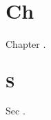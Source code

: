 \chapter{Ch}
Chapter \cite{alpha}.
\bibliographyunit[\section]
\section{S}
Sec \cite{beta}.
\putbib[refs]


